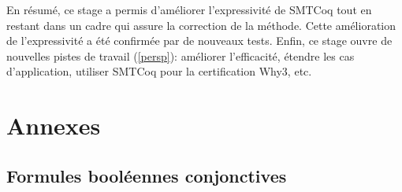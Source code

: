 \documentclass[11pt]{article}
\begin{document}
En résumé, ce stage a permis d'améliorer l'expressivité de SMTCoq tout en restant dans un cadre qui assure la correction de la méthode. Cette amélioration de l'expressivité a été confirmée par de nouveaux tests. Enfin, ce stage ouvre de nouvelles pistes de travail (\ref{persp}): améliorer l'efficacité, étendre les cas d'application, utiliser SMTCoq pour la certification Why3, etc.



\renewcommand\refname{Bibliographie}
\nocite{*}
{}


\newpage
\pagestyle{empty}

\section{Annexes}
\subsection{Formules booléennes conjonctives} \label{annexe_peigne}
\end{document}
